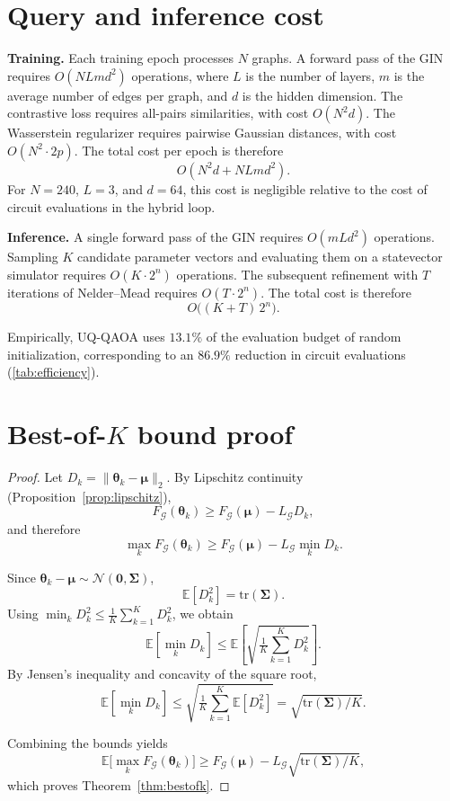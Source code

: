 \documentclass[aps,prx,reprint,superscriptaddress,longbibliography]{revtex4-2}
\newcommand{\GIN}{\textnormal{\textsc{GIN}}}
\newcommand{\UQQAOA}{\textnormal{\textsc{UQ-QAOA}}}
\newcommand{\Normal}{\mathcal{N}}
\newcommand{\calG}{\mathcal{G}}
\newcommand{\bbE}{\mathbb{E}}
\begin{document}
\section{Query and inference cost}
\label{app:complexity}

\textbf{Training.}
Each training epoch processes $N$ graphs. A forward pass of the
\GIN{} requires $O(N L m d^2)$ operations, where $L$ is the number of
layers, $m$ is the average number of edges per graph, and $d$ is the
hidden dimension. The contrastive loss requires all-pairs similarities,
with cost $O(N^2 d)$. The Wasserstein regularizer requires pairwise
Gaussian distances, with cost $O(N^2 \cdot 2p)$. The total cost per
epoch is therefore
\[
O(N^2 d + N L m d^2).
\]
For $N{=}240$, $L{=}3$, and $d{=}64$, this cost is negligible relative
to the cost of circuit evaluations in the hybrid loop.

\textbf{Inference.}
A single forward pass of the \GIN{} requires $O(m L d^2)$ operations.
Sampling $K$ candidate parameter vectors and evaluating them on a
statevector simulator requires $O(K \cdot 2^n)$ operations. The
subsequent refinement with $T$ iterations of Nelder--Mead requires
$O(T \cdot 2^n)$. The total cost is therefore
\[
O\bigl((K + T)\,2^n\bigr).
\]

Empirically, \UQQAOA{} uses $13.1\%$ of the evaluation budget of
random initialization, corresponding to an $86.9\%$ reduction in
circuit evaluations (\cref{tab:efficiency}).

\section{Best-of-$K$ bound proof}
\label{app:proof_bestofk}

\begin{proof}
Let $D_k = \|\bm\theta_k - \bm\mu\|_2$. By Lipschitz continuity
(Proposition~\ref{prop:lipschitz}),
\[
F_\calG(\bm\theta_k)
\ge F_\calG(\bm\mu) - L_\calG D_k,
\]
and therefore
\[
\max_k F_\calG(\bm\theta_k)
\ge F_\calG(\bm\mu) - L_\calG \min_k D_k.
\]

Since $\bm\theta_k - \bm\mu \sim \Normal(\bm{0},\bm\Sigma)$,
\[
\bbE[D_k^2] = \mathrm{tr}(\bm\Sigma).
\]
Using $\min_k D_k^2 \le \frac{1}{K}\sum_{k=1}^K D_k^2$, we obtain
\[
\bbE[\min_k D_k]
\le \bbE\!\left[
\sqrt{\tfrac{1}{K}\sum_{k=1}^K D_k^2}
\right].
\]
By Jensen's inequality and concavity of the square root,
\[
\bbE[\min_k D_k]
\le \sqrt{\tfrac{1}{K}\sum_{k=1}^K \bbE[D_k^2]}
= \sqrt{\mathrm{tr}(\bm\Sigma)/K}.
\]

Combining the bounds yields
\[
\bbE\bigl[\max_k F_\calG(\bm\theta_k)\bigr]
\ge F_\calG(\bm\mu)
- L_\calG \sqrt{\mathrm{tr}(\bm\Sigma)/K},
\]
which proves Theorem~\ref{thm:bestofk}.
\end{proof}
\end{document}
